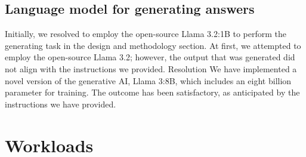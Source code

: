 \documentclass[12pt,oneside,openright,a4paper]{cpe-english-project}
\begin{document}
\subsection{Language model for generating answers}

Initially, we resolved to employ the open-source Llama 3.2:1B to perform the generating task in the design and methodology section. At first, we attempted to employ the open-source Llama 3.2; however, the output that was generated did not align with the instructions we provided. Resolution We have implemented a novel version of the generative AI, Llama 3:8B, which includes an eight billion parameter for training. The outcome has been satisfactory, as anticipated by the instructions we have provided.

\section {Workloads}
\end{document}
